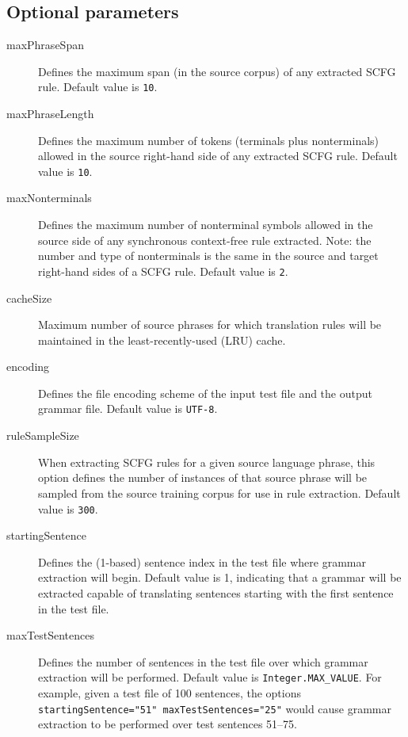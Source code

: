 \documentclass{pbml}
\begin{document}
\subsection{Optional parameters}
\begin{description}

	\item[maxPhraseSpan] Defines the maximum span (in the source corpus) of any extracted SCFG rule. Default value is {\tt 10}.

	\item[maxPhraseLength] Defines the maximum number of tokens (terminals plus nonterminals) allowed in the source right-hand side of any extracted SCFG rule. Default value is {\tt 10}.

	\item[maxNonterminals] Defines the maximum number of nonterminal symbols allowed in the source side of any synchronous context-free rule extracted. Note: the number and type of nonterminals is the same in the source and target right-hand sides of a SCFG rule. Default value is {\tt 2}.

	\item[cacheSize] Maximum number of source phrases for which translation rules will be maintained in the least-recently-used (LRU) cache.

	\item[encoding] Defines the file encoding scheme of the input test file and the output grammar file. Default value is {\tt UTF-8}.


	\item[ruleSampleSize] When extracting SCFG rules for a given source language phrase, this option defines the number of instances of that source phrase will be sampled from the source training corpus for use in rule extraction. Default value is {\tt 300}.
	
	\item[startingSentence] Defines the (1-based) sentence index in the test file where grammar extraction will begin. Default value is 1, indicating that a grammar will be extracted capable of translating sentences starting with the first sentence in the test file.

	\item[maxTestSentences] Defines the number of sentences in the test file over which grammar extraction will be performed. Default value is {\tt Integer.MAX\_VALUE}. For example, given a test file of 100 sentences, the options {\tt startingSentence="51"  maxTestSentences="25"} would cause grammar extraction to be performed over test sentences 51--75.

\end{description}
\end{document}
